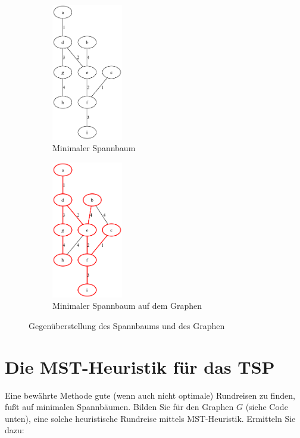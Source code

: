 \documentclass[a4paper,11pt]{report}
\begin{document}
    \begin{figure}[htbp]
        \centering
        \begin{subfigure}[b]{0.45\textwidth}
            \centering
            \includegraphics[width=\textwidth, height=6cm, keepaspectratio]{a03a_mst_4}
            \caption{Minimaler Spannbaum}
            \label{fig:a03_mst_04}
        \end{subfigure}
        \begin{subfigure}[b]{0.45\textwidth}
            \centering
            \includegraphics[width=\textwidth, height=6cm, keepaspectratio]{a03a_mst_4_highlighted}
            \caption{Minimaler Spannbaum auf dem Graphen}
            \label{fig:a03_mst_04_highlighted}
        \end{subfigure}
        \caption{Gegenüberstellung des Spannbaums und des Graphen}
        \label{fig:a03_04}
    \end{figure}
    \FloatBarrier
    
    \newpage

    \chapter{Die MST-Heuristik für das TSP}
    \label{ch:mstHeuristicTSP}
    Eine bewährte Methode gute (wenn auch nicht optimale) Rundreisen zu finden, fußt auf minimalen Spannbäumen.
    Bilden Sie für den Graphen $G$ (siehe Code unten), eine solche heuristische Rundreise mittels MST-Heuristik.
    Ermitteln Sie dazu:
\end{document}
